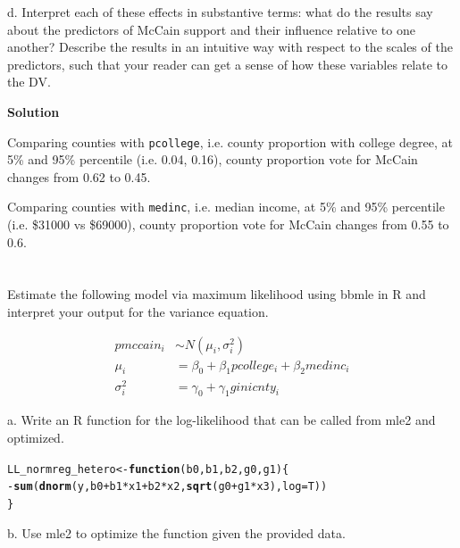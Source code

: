 \documentclass{article}\usepackage[]{graphicx}\usepackage[]{color}
\makeatletter
\newcommand{\hlopt}[1]{\textcolor[rgb]{0,0,0}{#1}}%
\newcommand{\hlstd}[1]{\textcolor[rgb]{0.345,0.345,0.345}{#1}}%
\newcommand{\hlkwa}[1]{\textcolor[rgb]{0.161,0.373,0.58}{\textbf{#1}}}%
\newcommand{\hlkwb}[1]{\textcolor[rgb]{0.69,0.353,0.396}{#1}}%
\newcommand{\hlkwc}[1]{\textcolor[rgb]{0.333,0.667,0.333}{#1}}%
\newcommand{\hlkwd}[1]{\textcolor[rgb]{0.737,0.353,0.396}{\textbf{#1}}}%
\newenvironment{kframe}{%
 \def\at@end@of@kframe{}%
 \ifinner\ifhmode%
  \def\at@end@of@kframe{\end{minipage}}%
  \begin{minipage}{\columnwidth}%
 \fi\fi%
 \def\FrameCommand##1{\hskip\@totalleftmargin \hskip-\fboxsep
 \colorbox{shadecolor}{##1}\hskip-\fboxsep
     \hskip-\linewidth \hskip-\@totalleftmargin \hskip\columnwidth}%
 \MakeFramed {\advance\hsize-\width
   \@totalleftmargin\z@ \linewidth\hsize
   \@setminipage}}%
 {\par\unskip\endMakeFramed%
 \at@end@of@kframe}
\newenvironment{knitrout}{}{} %
\makeatother
\begin{document}
d. Interpret each of these effects in substantive terms: what do the results say about the predictors of McCain support and their influence relative to one another? Describe the results in an intuitive way with respect to the scales of the predictors, such that your reader can get a sense of how these variables relate to the DV.

\textbf{Solution}

Comparing counties with \verb`pcollege`, i.e. county proportion with college degree, at 5\% and 95\% percentile (i.e. 0.04, 0.16), county proportion vote for McCain changes from 0.62 to 0.45.

Comparing counties with \verb`medinc`, i.e. median income, at 5\% and 95\% percentile (i.e. \$31000 vs \$69000), county proportion vote for McCain changes from 0.55 to 0.6.

\section{}

Estimate the following model via maximum likelihood using bbmle in R and interpret your output for the variance equation.

\begin{align}
pmccain_i &\sim N(\mu_i, \sigma_i^2) \\
\mu_i &= \beta_0 + \beta_1 pcollege_i + \beta_2 medinc_i \\
\sigma_i^2 &= \gamma_0 + \gamma_1 ginicnty_i
\end{align}

a. Write an R function for the log-likelihood that can be called from mle2 and optimized.

\begin{knitrout}
\color{fgcolor}\begin{kframe}
\begin{alltt}
\hlstd{LL_normreg_hetero} \hlkwb{<-} \hlkwa{function}\hlstd{(}\hlkwc{b0}\hlstd{,} \hlkwc{b1}\hlstd{,} \hlkwc{b2}\hlstd{,} \hlkwc{g0}\hlstd{,} \hlkwc{g1}\hlstd{) \{}
  \hlopt{-} \hlkwd{sum}\hlstd{(}\hlkwd{dnorm}\hlstd{(y, b0} \hlopt{+} \hlstd{b1}\hlopt{*}\hlstd{x1} \hlopt{+} \hlstd{b2}\hlopt{*}\hlstd{x2,} \hlkwd{sqrt}\hlstd{(g0} \hlopt{+} \hlstd{g1}\hlopt{*}\hlstd{x3),} \hlkwc{log} \hlstd{= T))}
\hlstd{\}}
\end{alltt}
\end{kframe}
\end{knitrout}

b. Use mle2 to optimize the function given the provided data.
\end{document}
